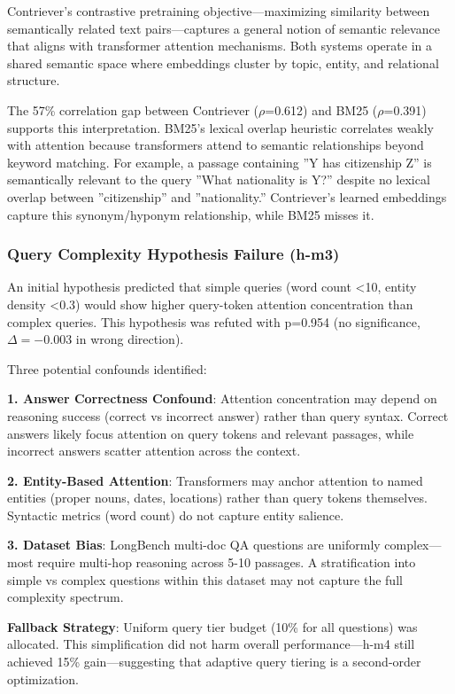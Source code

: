 Contriever's contrastive pretraining objective---maximizing similarity between semantically related text pairs---captures a general notion of semantic relevance that aligns with transformer attention mechanisms. Both systems operate in a shared semantic space where embeddings cluster by topic, entity, and relational structure.

The 57\% correlation gap between Contriever ($\rho$=0.612) and BM25 ($\rho$=0.391) supports this interpretation. BM25's lexical overlap heuristic correlates weakly with attention because transformers attend to semantic relationships beyond keyword matching. For example, a passage containing ''Y has citizenship Z'' is semantically relevant to the query ''What nationality is Y?'' despite no lexical overlap between ''citizenship'' and ''nationality.'' Contriever's learned embeddings capture this synonym/hyponym relationship, while BM25 misses it.

\subsubsection{Query Complexity Hypothesis Failure (h-m3)}

An initial hypothesis predicted that simple queries (word count <10, entity density <0.3) would show higher query-token attention concentration than complex queries. This hypothesis was refuted with p=0.954 (no significance, $\Delta =-0.003$ in wrong direction).

Three potential confounds identified:

\textbf{1. Answer Correctness Confound}: Attention concentration may depend on reasoning success (correct vs incorrect answer) rather than query syntax. Correct answers likely focus attention on query tokens and relevant passages, while incorrect answers scatter attention across the context.

\textbf{2. Entity-Based Attention}: Transformers may anchor attention to named entities (proper nouns, dates, locations) rather than query tokens themselves. Syntactic metrics (word count) do not capture entity salience.

\textbf{3. Dataset Bias}: LongBench multi-doc QA questions are uniformly complex---most require multi-hop reasoning across 5-10 passages. A stratification into simple vs complex questions within this dataset may not capture the full complexity spectrum.

\textbf{Fallback Strategy}: Uniform query tier budget (10\% for all questions) was allocated. This simplification did not harm overall performance---h-m4 still achieved 15\% gain---suggesting that adaptive query tiering is a second-order optimization.

